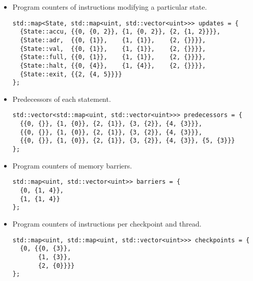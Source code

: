 \begin{itemize}
\item Program counters of instructions modifying a particular state.
\begin{lstlisting}[style=c++]
std::map<State, std::map<uint, std::vector<uint>>> updates = {
  {State::accu, {{0, {0, 2}}, {1, {0, 2}}, {2, {1, 2}}}},
  {State::adr,  {{0, {1}},    {1, {1}},    {2, {}}}},
  {State::val,  {{0, {1}},    {1, {1}},    {2, {}}}},
  {State::full, {{0, {1}},    {1, {1}},    {2, {}}}},
  {State::halt, {{0, {4}},    {1, {4}},    {2, {}}}},
  {State::exit, {{2, {4, 5}}}}
};
\end{lstlisting}

\item Predecessors of each statement.
\begin{lstlisting}[style=c++]
std::vector<std::map<uint, std::vector<uint>>> predecessors = {
  {{0, {}}, {1, {0}}, {2, {1}}, {3, {2}}, {4, {3}}},
  {{0, {}}, {1, {0}}, {2, {1}}, {3, {2}}, {4, {3}}},
  {{0, {}}, {1, {0}}, {2, {1}}, {3, {2}}, {4, {3}}, {5, {3}}}
};
\end{lstlisting}

\item Program counters of memory barriers.
\begin{lstlisting}[style=c++]
std::map<uint, std::vector<uint>> barriers = {
  {0, {1, 4}},
  {1, {1, 4}}
};
\end{lstlisting}

\item Program counters of  instructions per checkpoint and thread.
\begin{lstlisting}[style=c++]
std::map<uint, std::map<uint, std::vector<uint>>> checkpoints = {
  {0, {{0, {3}},
       {1, {3}},
       {2, {0}}}}
};
\end{lstlisting}
\end{itemize}



